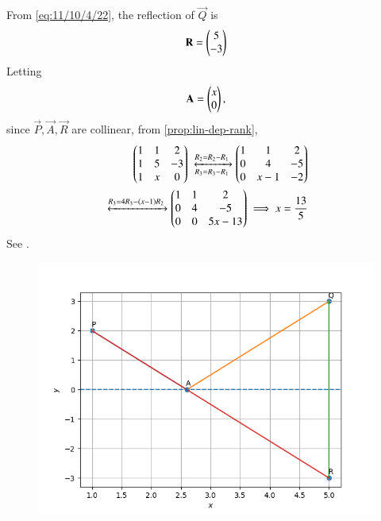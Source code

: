 	From \eqref{eq:11/10/4/22},
the reflection of $\vec{Q}$ is 
\begin{align}
\mathbf{R}  
= \begin{pmatrix}5\\-3\end{pmatrix}
\end{align}
Letting
\begin{align}
\mathbf{A} = \begin{pmatrix}x\\0\end{pmatrix},
\end{align}
since 
$\vec{P},
\vec{A},  
\vec{R}  
$
are collinear, 
		from \eqref{prop:lin-dep-rank},
\begin{align}
	\myvec{
		1 & 1 & 2 
		\\ 
		1 & 5 & -3 
		\\
		1 & x & 0 }
	\xleftrightarrow[R_3=R_3 - R_1]{R_2 = R_2 - R_1}
	\myvec{
		1 & 1 & 2 
		\\ 
		0 & 4 & -5 
		\\
		0 & x-1 & -2 }
	\\
	\xleftrightarrow[]{R_3 = 4R_3 - \brak{x-1}R_2}
	\myvec{
		1 & 1 & 2 
		\\ 
		0 & 4 & -5 
		\\
		0 & 0 & 5x-13 }
	\implies x = \frac{13}{5}
\end{align}
See  
.
\begin{figure}[ht]
\centering
\includegraphics[width = \columnwidth]{chapters/11/10/4/22/figs/fig.png}
\caption{}
\label{fig:chapters/11/10/4/22/1}
\end{figure}



